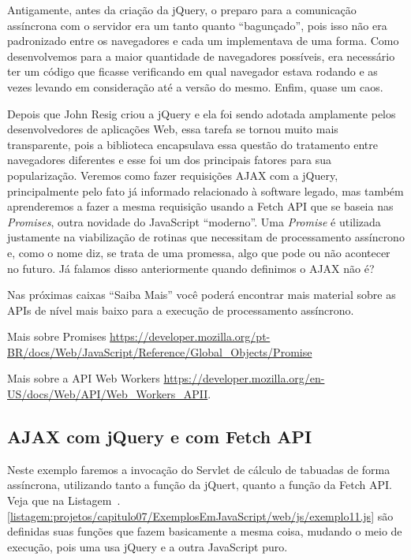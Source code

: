 Antigamente, antes da criação da jQuery, o preparo para a comunicação assíncrona com o servidor era um tanto quanto ``bagunçado'', pois isso não era padronizado entre os navegadores e cada um implementava de uma forma. Como desenvolvemos para a maior quantidade de navegadores possíveis, era necessário ter um código que ficasse verificando em qual navegador estava rodando e as vezes levando em consideração até a versão do mesmo. Enfim, quase um caos.

Depois que John Resig criou a jQuery e ela foi sendo adotada amplamente pelos desenvolvedores de aplicações Web, essa tarefa se tornou muito mais transparente, pois a biblioteca encapsulava essa questão do tratamento entre navegadores diferentes e esse foi um dos principais fatores para sua popularização. Veremos como fazer requisições AJAX com a jQuery, principalmente pelo fato já informado relacionado à software legado, mas também aprenderemos a fazer a mesma requisição usando a Fetch API que se baseia nas \textit{Promises}, outra novidade do JavaScript ``moderno''. Uma \textit{Promise} é utilizada justamente na viabilização de rotinas que necessitam de processamento assíncrono e, como o nome diz, se trata de uma promessa, algo que pode ou não acontecer no futuro. Já falamos disso anteriormente quando definimos o AJAX não é?

Nas próximas caixas ``Saiba Mais'' você poderá encontrar mais material sobre as APIs de nível mais baixo para a execução de processamento assíncrono.

\begin{saibaMais}
    Mais sobre Promises \url{https://developer.mozilla.org/pt-BR/docs/Web/JavaScript/Reference/Global_Objects/Promise}
\end{saibaMais}

\begin{saibaMais}
    Mais sobre a API Web Workers \url{https://developer.mozilla.org/en-US/docs/Web/API/Web_Workers_APII}.
\end{saibaMais}



\subsection{AJAX com jQuery e com Fetch API}

Neste exemplo faremos a invocação do Servlet de cálculo de tabuadas de forma assíncrona, utilizando tanto a função  da jQuert, quanto a função  da Fetch API. Veja que na Listagem~\thechapter.\ref{listagem:projetos/capitulo07/ExemplosEmJavaScript/web/js/exemplo11.js} são definidas suas funções que fazem basicamente a mesma coisa, mudando o meio de execução, pois uma usa jQuery e a outra JavaScript puro.

